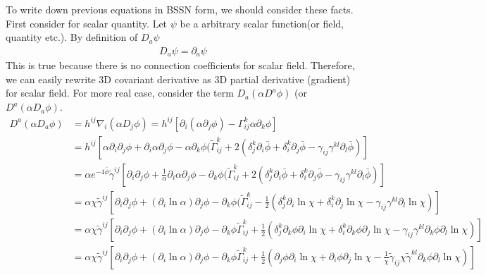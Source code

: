 \documentclass[prd]{revtex4}
\begin{document}
To write down previous equations in BSSN form, we should consider these facts. First consider for scalar quantity. Let $\psi$ be a arbitrary scalar function(or field, quantity etc.). By definition of $D_a \psi$
\begin{align}
D_a \psi = \partial_a \psi
\end{align}
This is true because there is no connection coefficients for scalar field. Therefore, we can easily rewrite 3D covariant derivative as 3D partial derivative (gradient) for scalar field. For more real case, consider the term $D_a (\alpha D^a \phi)$ (or $D^a (\alpha D_a \phi)$.
\begin{align}
D^a (\alpha D_a \phi) &= h^{ij} \nabla_i (\alpha D_j \phi) = h^{ij} [ \partial_i (\alpha \partial_j \phi) - \Gamma_{ij}^k \alpha \partial_k \phi] \nonumber \\
				&=h^{ij} [ \alpha \partial_i \partial_j \phi + \partial_i \alpha \partial_j \phi - \alpha \partial_k \phi (\tilde{\Gamma}_{ij}^k + 2 ( \delta_j^k \partial_i \bar{\phi} + \delta_i^k \partial_j \bar{\phi} - \gamma_{ij} \gamma^{kl} \partial_l \bar{\phi})] \nonumber \\
				&=\alpha e^{-4 \bar{\phi}} \tilde{\gamma}^{ij} [ \partial_i \partial_j \phi + \frac{1}{\alpha} \partial_i \alpha \partial_j \phi - \partial_k \phi (\tilde{\Gamma}_{ij}^k + 2 ( \delta_j^k \partial_i \bar{\phi} + \delta_i^k \partial_j \bar{\phi} - \gamma_{ij} \gamma^{kl} \partial_l \bar{\phi})] \nonumber \\
				&=\alpha \chi \tilde{\gamma}^{ij} [ \partial_i \partial_j \phi +  (\partial_i \ln \alpha) \partial_j \phi - \partial_k \phi (\tilde{\Gamma}_{ij}^k -\frac{1}{2} ( \delta_j^k \partial_i \ln \chi + \delta_i^k \partial_j \ln \chi - \gamma_{ij} \gamma^{kl} \partial_l \ln \chi)] \nonumber \\
				&=\alpha \chi \tilde{\gamma}^{ij} [ \partial_i \partial_j \phi +  (\partial_i \ln \alpha) \partial_j \phi - \partial_k \phi \tilde{\Gamma}_{ij}^k + \frac{1}{2}( \delta_j^k \partial_k \phi \partial_i \ln \chi + \delta_i^k \partial_k \phi \partial_j \ln \chi - \gamma_{ij} \gamma^{kl} \partial_k \phi \partial_l \ln \chi)] \nonumber \\
				&= \alpha \chi \tilde{\gamma}^{ij} [ \partial_i \partial_j \phi +  (\partial_i \ln \alpha) \partial_j \phi - \partial_k \phi \tilde{\Gamma}_{ij}^k + \frac{1}{2}( \partial_j \phi \partial_i \ln \chi + \partial_i \phi \partial_j \ln \chi -\frac{1}{\chi} \tilde{\gamma}_{ij} \chi \tilde{\gamma}^{kl} \partial_k \phi \partial_l \ln \chi)] \nonumber \\

\end{align}
\end{document}
